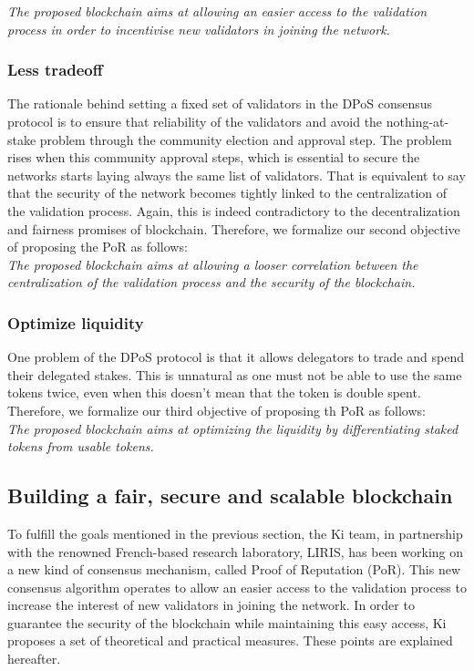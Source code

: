 \textit{The proposed blockchain aims at allowing an easier access to the validation process in order to incentivise new validators in joining the network.}

\subsubsection{Less tradeoff} The rationale behind setting a fixed set of validators in the DPoS consensus protocol is to ensure that reliability of the validators and avoid the nothing-at-stake problem through the community election and approval step. The problem rises when this community approval steps, which is essential to secure the networks starts laying always the same list of validators. That is equivalent to say that the security of the network becomes tightly linked to the centralization of the validation process. Again, this is indeed contradictory to the decentralization and fairness promises of blockchain. Therefore, we formalize our second objective of proposing the PoR as follows:\\

\textit{The proposed blockchain aims at allowing a looser correlation between the centralization of the validation process and the security of the blockchain. }

\subsubsection{Optimize liquidity} One problem of the DPoS protocol is that it allows delegators to trade and spend their delegated stakes. This is unnatural as one must not be able to use the same tokens twice, even when this doesn't mean that the token is double spent. Therefore, we formalize our third objective of proposing th PoR as follows:\\

\textit{The proposed blockchain aims at optimizing the liquidity by differentiating staked tokens from usable tokens. }

\subsection{Building a fair, secure and scalable blockchain}
To fulfill the goals mentioned in the previous section, the Ki team, in partnership with the renowned French-based research laboratory, LIRIS, has been working on a new kind of consensus mechanism, called Proof of Reputation (PoR). This new consensus algorithm operates to allow an easier access to the validation process to increase the interest of new validators in joining the network. In order to guarantee the security of the blockchain while maintaining this easy access, Ki proposes a set of theoretical and practical measures. These points are explained hereafter.


